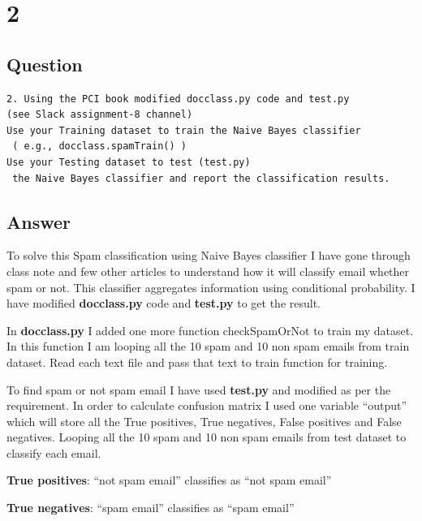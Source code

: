 \documentclass[letterpaper,11pt]{article}
\begin{document}
\clearpage


\section*{2}

\subsection*{Question}

\begin{verbatim}
2. Using the PCI book modified docclass.py code and test.py 
(see Slack assignment-8 channel)
Use your Training dataset to train the Naive Bayes classifier
 ( e.g., docclass.spamTrain() )
Use your Testing dataset to test (test.py)
 the Naive Bayes classifier and report the classification results.
\end{verbatim}

\subsection*{Answer}

To solve this Spam classification using Naive Bayes classifier I have gone through class note and  few other articles to understand how it will classify email  whether  spam or not. This classifier aggregates information using conditional probability. I have modified \textbf{docclass.py} code and\textbf{ test.py} to get the result.

In \textbf{docclass.py}  I added one more function checkSpamOrNot to train my dataset. In this function I am looping all the 10 spam and 10 non spam emails from train dataset. Read each text file and pass that text to train function for training. 

To find spam or not spam email I have used \textbf{test.py} and modified as per the requirement. In order to calculate confusion matrix I used one variable “output” which will store all the True positives, True negatives, False positives and False negatives. Looping all the 10 spam and 10 non spam emails from test dataset to classify each email.



\textbf{True positives}: “not spam email” classifies as “not spam email”

\textbf{True negatives}: “spam email” classifies as “spam email”
\end{document}

